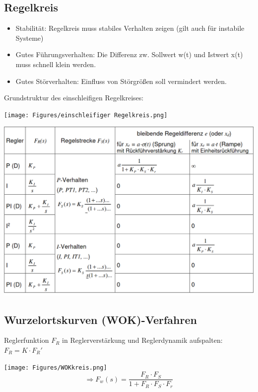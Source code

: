 \documentclass[10pt,a4paper]{article}
\begin{document}
\subsection{Regelkreis}
\begin{mdframed}[style=exercise,frametitle=Anforderungen:]
	\begin{itemize}[leftmargin=*]
		\item Stabilität: Regelkreis muss stabiles Verhalten zeigen (gilt
		      auch für instabile Systeme)
		\item Gutes Führungsverhalten: Die Differenz zw. Sollwert w(t) und
		      Istwert x(t) muss schnell klein werden.
		\item Gutes Störverhalten: Einfluss von Störgrößen soll vermindert
		      werden.
	\end{itemize}
\end{mdframed}

Grundstruktur des einschleifigen Regelkreises:

\texttt{[image: Figures/einschleifiger Regelkreis.png]}

\includegraphics[width=0.98\columnwidth]{Figures/Reglerauswahl.png}


\subsection{Wurzelortskurven (WOK)-Verfahren}
\begin{mdframed}[style=exercise]
	Reglerfunktion $F_R$ in Reglerverstärkung und Reglerdynamik aufspalten:
	$F_R =K \cdot F_R ' $
\end{mdframed}

\texttt{[image: Figures/WOKkreis.png]}
\[
	\Rightarrow F_w (s)= \dfrac {F_R \cdot F_S} {1+F_R \cdot F_S \cdot F_r}
\]
\end{document}
